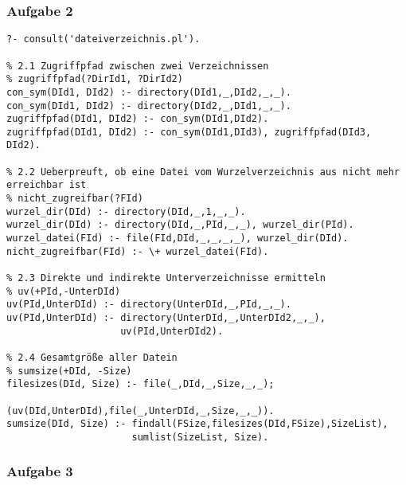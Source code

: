 \documentclass[]{article}
\begin{document}
\subsubsection{Aufgabe 2}\label{header-n129}

\begin{verbatim}
?- consult('dateiverzeichnis.pl').

% 2.1 Zugriffpfad zwischen zwei Verzeichnissen
% zugriffpfad(?DirId1, ?DirId2)
con_sym(DId1, DId2) :- directory(DId1,_,DId2,_,_).
con_sym(DId1, DId2) :- directory(DId2,_,DId1,_,_).
zugriffpfad(DId1, DId2) :- con_sym(DId1,DId2).
zugriffpfad(DId1, DId2) :- con_sym(DId1,DId3), zugriffpfad(DId3, DId2).

% 2.2 Ueberpreuft, ob eine Datei vom Wurzelverzeichnis aus nicht mehr erreichbar ist
% nicht_zugreifbar(?FId)
wurzel_dir(DId) :- directory(DId,_,1,_,_).
wurzel_dir(DId) :- directory(DId,_,PId,_,_), wurzel_dir(PId).
wurzel_datei(FId) :- file(FId,DId,_,_,_,_), wurzel_dir(DId).
nicht_zugreifbar(FId) :- \+ wurzel_datei(FId).

% 2.3 Direkte und indirekte Unterverzeichnisse ermitteln
% uv(+PId,-UnterDId)
uv(PId,UnterDId) :- directory(UnterDId,_,PId,_,_).
uv(PId,UnterDId) :- directory(UnterDId,_,UnterDId2,_,_),
                    uv(PId,UnterDId2).

% 2.4 Gesamtgröße aller Datein
% sumsize(+DId, -Size)
filesizes(DId, Size) :- file(_,DId,_,Size,_,_);
                        (uv(DId,UnterDId),file(_,UnterDId,_,Size,_,_)).
sumsize(DId, Size) :- findall(FSize,filesizes(DId,FSize),SizeList),
                      sumlist(SizeList, Size).
\end{verbatim}

\subsubsection{Aufgabe 3}\label{header-n131}
\end{document}
